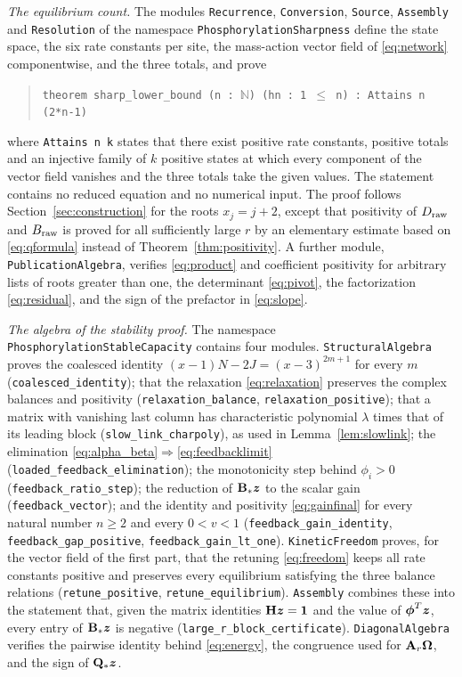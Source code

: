 \emph{The equilibrium count.} The modules \texttt{Recurrence}, \texttt{Conversion},
\texttt{Source}, \texttt{Assembly} and \texttt{Resolution} of the namespace
\texttt{PhosphorylationSharpness} define the state space, the six rate constants per site, the
mass-action vector field of \eqref{eq:network} componentwise, and the three totals, and prove
\begin{quote}
\texttt{theorem sharp\_lower\_bound (n :\ $\mathbb N$) (hn :\ 1 $\le$ n) :\ Attains n (2*n-1)}
\end{quote}
where \texttt{Attains n k} states that there exist positive rate constants, positive totals and
an injective family of \(k\) positive states at which every component of the vector field
vanishes and the three totals take the given values. The statement contains no reduced
equation and no numerical input. The proof follows Section~\ref{sec:construction} for the roots
\(x_j=j+2\), except that positivity of \(D_{\mathrm{raw}}\) and \(B_{\mathrm{raw}}\) is proved for all
sufficiently large \(r\) by an elementary estimate based on \eqref{eq:qformula} instead of
Theorem~\ref{thm:positivity}. A further module, \texttt{PublicationAlgebra}, verifies
\eqref{eq:product} and coefficient positivity for arbitrary lists of roots greater than one,
the determinant \eqref{eq:pivot}, the factorization \eqref{eq:residual}, and the sign of the
prefactor in \eqref{eq:slope}.

\emph{The algebra of the stability proof.} The namespace \texttt{PhosphorylationStableCapacity}
contains four modules. \texttt{StructuralAlgebra} proves the coalesced identity
\((x-1)N-2J=(x-3)^{2m+1}\) for every \(m\) (\texttt{coalesced\_identity}); that the relaxation
\eqref{eq:relaxation} preserves the complex balances and positivity
(\texttt{relaxation\_balance}, \texttt{relaxation\_positive}); that a matrix with vanishing
last column has characteristic polynomial \(\lambda\) times that of its leading block
(\texttt{slow\_link\_charpoly}), as used in Lemma~\ref{lem:slowlink}; the elimination
\eqref{eq:alpha_beta}\(\Rightarrow\)\eqref{eq:feedbacklimit}
(\texttt{loaded\_feedback\_elimination}); the monotonicity step behind \(\phi_i>0\)
(\texttt{feedback\_ratio\_step}); the reduction of \(\mathbf B_*\boldsymbol z\) to the scalar gain
(\texttt{feedback\_vector}); and the identity and positivity \eqref{eq:gainfinal} for every
natural number \(n\ge2\) and every \(0<v<1\) (\texttt{feedback\_gain\_identity},
\texttt{feedback\_gap\_positive}, \texttt{feedback\_gain\_lt\_one}). \texttt{KineticFreedom}
proves, for the vector field of the first part, that the retuning \eqref{eq:freedom} keeps all
rate constants positive and preserves every equilibrium satisfying the three balance
relations (\texttt{retune\_positive}, \texttt{retune\_equilibrium}). \texttt{Assembly} combines
these into the statement that, given the matrix identities \(\mathbf H\boldsymbol z=\boldsymbol 1\) and the value of
\(\boldsymbol\phi^{T}\boldsymbol z\), every entry of \(\mathbf B_*\boldsymbol z\) is negative
(\texttt{large\_r\_block\_certificate}). \texttt{DiagonalAlgebra} verifies the pairwise identity
behind \eqref{eq:energy}, the congruence used for \(\mathbf A_r\boldsymbol\Omega\), and the sign of
\(\mathbf Q_*\boldsymbol z\).


